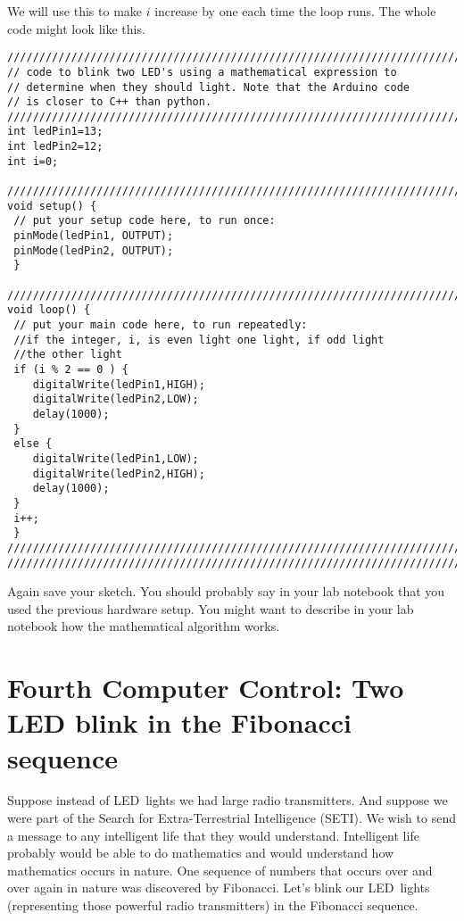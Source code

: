 We will use this to make $i$ increase by one each time the loop runs. The
whole code might look like this.
\begin{verbatim}
////////////////////////////////////////////////////////////////////////////
// code to blink two LED's using a mathematical expression to 
// determine when they should light. Note that the Arduino code
// is closer to C++ than python.
////////////////////////////////////////////////////////////////////////////
int ledPin1=13;
int ledPin2=12;
int i=0;
 
////////////////////////////////////////////////////////////////////////////
void setup() {
 // put your setup code here, to run once:
 pinMode(ledPin1, OUTPUT);
 pinMode(ledPin2, OUTPUT);
 }
 
////////////////////////////////////////////////////////////////////////////
void loop() {
 // put your main code here, to run repeatedly:
 //if the integer, i, is even light one light, if odd light 
 //the other light
 if (i % 2 == 0 ) {
    digitalWrite(ledPin1,HIGH);
    digitalWrite(ledPin2,LOW);
    delay(1000);
 }
 else {
    digitalWrite(ledPin1,LOW);
    digitalWrite(ledPin2,HIGH);
    delay(1000);
 }
 i++;
 }
////////////////////////////////////////////////////////////////////////////
////////////////////////////////////////////////////////////////////////////
\end{verbatim}

Again save your sketch. You should probably say in your lab notebook that
you used the previous hardware setup. You might want to describe in your lab
notebook how the mathematical algorithm works.

\section{Fourth Computer Control: Two LED blink in the Fibonacci sequence}

Suppose instead of LED\ lights we had large radio transmitters. And suppose
we were part of the Search for Extra-Terrestrial Intelligence (SETI). We
wish to send a message to any intelligent life that they would understand.
Intelligent life probably would be able to do mathematics and would
understand how mathematics occurs in nature. One sequence of numbers that
occurs over and over again in nature was discovered by Fibonacci. Let's
blink our LED\ lights (representing those powerful radio transmitters) in
the Fibonacci sequence.

